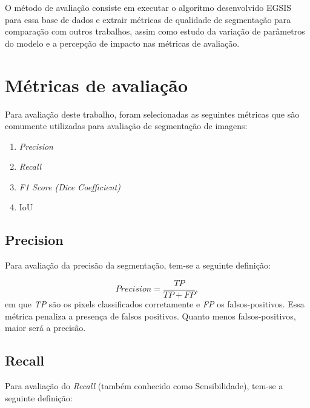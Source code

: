 
O método de avaliação consiste em executar o algoritmo desenvolvido
\gls{EGSIS} para essa base de dados e extrair métricas de qualidade de
segmentação para comparação com outros trabalhos, assim como estudo da
variação de parâmetros do modelo e a percepção de impacto nas métricas
de avaliação.

\section{Métricas de avaliação}\label{sec:metricas-avaliacao}

Para avaliação deste trabalho, foram selecionadas as seguintes métricas
que são comumente utilizadas para avaliação de segmentação de imagens:

\begin{enumerate}
\item \textit{Precision}
\item \textit{Recall}
\item \textit{F1 Score (Dice Coefficient)}
\item IoU
\end{enumerate}


\subsection{Precision}\label{sec:precision}

Para avaliação da precisão da segmentação, tem-se a seguinte definição:

\begin{equation}\label{eq:precision}
  Precision = \dfrac{TP}{TP + FP},
\end{equation}
\noindent
em que \textit{TP} são os pixels classificados corretamente e \textit{FP}
os falsos-positivos. Essa métrica penaliza a presença de falsos
positivos. Quanto menos falsos-positivos, maior será a precisão.


\subsection{Recall}\label{sec:recall}

Para avaliação do \textit{Recall} (também conhecido como Sensibilidade), tem-se a seguinte definição:

